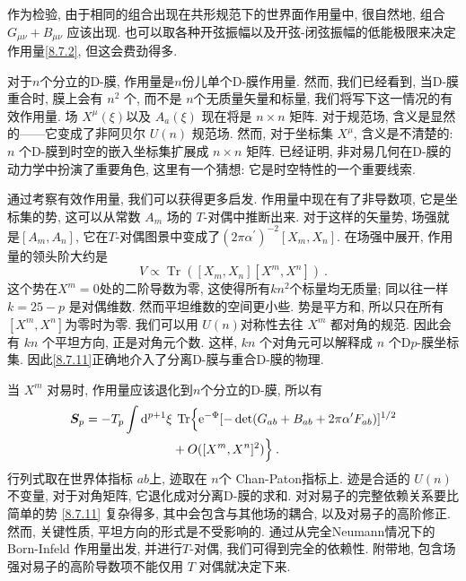 作为检验, 由于相同的组合出现在共形规范下的世界面作用量中, 很自然地, 组合 $G_{\mu \nu}+B_{\mu \nu}$ 应该出现. 
也可以取各种开弦振幅以及开弦-闭弦振幅的低能极限来决定作用量\eqref{8.7.2}, 但这会费劲得多.

对于$n$个分立的D-膜, 作用量是$n$份儿单个D-膜作用量. 然而, 我们已经看到, 当D-膜重合时, 膜上会有 $n^{2}$ 个, 而不是 $n$个无质量矢量和标量, 
我们将写下这一情况的有效作用量. 场 $X^{\mu}(\xi)$以及 $A_{a}(\xi)$ 现在将是 $n \times n$ 矩阵. 对于规范场, 
含义是显然的——它变成了非阿贝尔 $U(n)$ 规范场. 然而, 对于坐标集 $X^{\mu}$, 含义是不清楚的: $n$ 个D-膜到时空的嵌入坐标集扩展成 $n \times n$ 矩阵. 
已经证明, 非对易几何在D-膜的动力学中扮演了重要角色, 这里有一个猜想: 它是时空特性的一个重要线索.

通过考察有效作用量, 我们可以获得更多启发. 作用量中现在有了非导数项, 它是坐标集的势, 这可以从常数 $A_{m}$ 场的 $T$-对偶中推断出来. 
对于这样的矢量势, 场强就是$[A_{m}, A_{n}]$, 它在$T$-对偶图景中变成了$(2 \pi \alpha^{\prime})^{-2}[X_{m}, X_{n}]$. 
在场强中展开, 作用量的领头阶大约是
\begin{equation}
	V \propto \operatorname{Tr}([X_{m}, X_{n}][X^{m}, X^{n}]) \:. \label{8.7.11}
\end{equation}
这个势在$X^{m}=0$处的二阶导数为零, 这使得所有$k n^{2}$个标量均无质量; 同以往一样 $k=25{-}p$ 是对偶维数. 
然而平坦维数的空间更小些. 势是平方和, 所以只在所有 $[X^{m}, X^{n}]$为零时为零. 我们可以用 $U(n)$对称性去往 $X^{m}$ 都对角的规范. 
因此会有 $kn$ 个平坦方向, 正是对角元个数. 这样, $kn$ 个对角元可以解释成 $n$ 个D$p$-膜坐标集. 
因此\eqref{8.7.11}正确地介入了分离D-膜与重合D-膜的物理.

当 $X^{m}$ 对易时, 作用量应该退化到$n$个分立的D-膜, 所以有
\begin{align}
	\bm{S}_{p} &= -T_{p} \int \mathrm{d}^{p+1} \xi \: \operatorname{Tr} \Bigl\{ \mathrm{e}^{-\Phi}
	              [-\operatorname{det}(G_{ab} + B_{ab} + 2 \pi \alpha^{\prime} F_{ab})]^{1/2} \nonumber \\
		       &\qquad \qquad \qquad \quad + O([X^{m}, X^{n}]^{2})\Bigr\} \:. \label{8.7.12}
\end{align}
行列式取在世界体指标 $ab$上, 迹取在 $n$个 Chan-Paton指标上. 迹是合适的 $U(n)$ 不变量, 对于对角矩阵, 它退化成对分离D-膜的求和. 
对对易子的完整依赖关系要比简单的势 \eqref{8.7.11} 复杂得多, 其中会包含与其他场的耦合, 以及对易子的高阶修正. 
然而, 关键性质, 平坦方向的形式是不受影响的. 通过从完全Neumann情况下的 Born-Infeld 作用量出发, 并进行$T$-对偶, 我们可得到完全的依赖性. 
附带地, 包含场强对易子的高阶导数项不能仅用 $T$ 对偶就决定下来.

